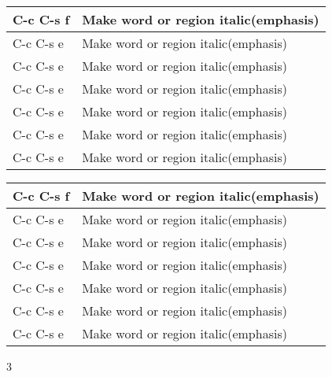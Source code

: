 \documentclass[landscape, zihao=5]{ctexart}
\begin{document}
\begin{multicols}{3}
  \begin{tabu}{|X[1]|X[3]|}
    \hline
    C-c C-s f & Make word or region italic(emphasis) \\ \hline
    C-c C-s e & Make word or region italic(emphasis) \\
    C-c C-s e & Make word or region italic(emphasis) \\
    C-c C-s e & Make word or region italic(emphasis) \\
    C-c C-s e & Make word or region italic(emphasis) \\
    C-c C-s e & Make word or region italic(emphasis) \\
    C-c C-s e & Make word or region italic(emphasis) \\
  \end{tabu}

  
  \begin{tabu}{|X[1]|X[3]|}
    \hline
    C-c C-s f & Make word or region italic(emphasis) \\ \hline
    C-c C-s e & Make word or region italic(emphasis) \\
    C-c C-s e & Make word or region italic(emphasis) \\
    C-c C-s e & Make word or region italic(emphasis) \\
    C-c C-s e & Make word or region italic(emphasis) \\
    C-c C-s e & Make word or region italic(emphasis) \\
    C-c C-s e & Make word or region italic(emphasis) \\
  \end{tabu}

\end{multicols}{3}
\end{document}
